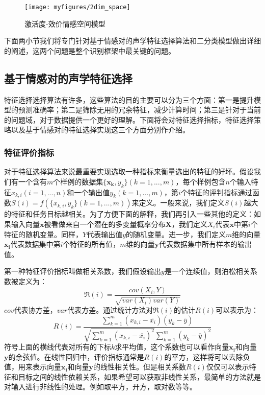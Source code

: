 \begin{figure}[H] %
    \centering
    \texttt{[image: myfigures/2dim\_space]}
    \caption{激活度-效价情感空间模型}
    \label{fig:xfig1}
\end{figure}

下面两小节我们将专门针对基于情感对的声学特征选择算法和二分类模型做出详细的阐述，这两个问题是整个识别框架中最关键的问题。

\subsection{基于情感对的声学特征选择}
\label{ssec:emo_pair_feature_select}
特征选择选择算法有许多，这些算法的目的主要可以分为三个方面：第一是提升模型的预测准确率；第二是筛除无用的冗余特征，减少计算时间；第三是针对于当前的问题域，对于数据提供一个更好的理解。下面将会对特征选择指标，特征选择策略以及基于情感对的特征选择实现这三个方面分别作介绍。

\subsubsection{特征评价指标}
\label{sssec:feature_select_metrics}
对于特征选择算法来说最重要实现选取一种指标来衡量选出的特征的好坏。假设我们有一个含有$m$个样例的数据集$\{\mathbf{x_k}, y_k\}(k=1,...,m)$，每个样例包含$n$个输入特征$x_{k,i}(i=1,...,n)$和一个输出值$y_k(k=1,...,m)$，第$i$个特征的评判指标通过函数$S(i)=f(\{x_{k,i}, y_k\}(k=1,...,m))$来定义。一般来说，我们定义$S(i)$越大的特征和任务目标越相关。为了方便下面的解释，我们再引入一些其他的定义：如果输入向量$\mathbf{x}$被看做来自一个潜在的多变量概率分布$\mathbf{X}$，我们定义$X_i$代表$\mathbf{x}$中第$i$个特征的随机变量。同样，$Y$代表输出值$y$的随机变量。进一步，我们定义$m$维的向量$\mathbf{x_i}$代表数据集中第$i$个特征的所有值，$m$维的向量$\mathbf{y}$代表数据集中所有样本的输出值。

第一种特征评价指标叫做相关系数，我们假设输出$y$是一个连续值，则泊松相关系数被定义为：
\begin{equation}
\label{equ:pearson_cc}
    \Re(i) = \frac{cov(X_i, Y)}{\sqrt{var(X_i)var(Y)}}
\end{equation}
$cov$代表协方差，$var$代表方差。通过统计方法对$\Re(i)$的估计$R(i)$可以表示为：
\begin{equation}
\label{equ:pearson_cc_real}
    R(i) = \frac{\sum_{k=1}^{m}(x_{k,i} - \overline{x_i})(y_k - \overline{y})}{\sqrt{\sum_{k=1}^{m}(x_{k,i} - \overline{x_i})^2}\sum_{k=1}^{m}(y_k - \overline{y})^2}
\end{equation}
符号上面的横线代表对所有的下标$k$求平均值，这个系数也可以看作向量$\mathbf{x_i}$和向量$\mathbf{y}$的余弦值。在线性回归中，评价指标通常是$R(i)$的平方，这样将可以去除负值，用来表示向量$\mathbf{x_i}$和向量$\mathbf{y}$的线性相关性。但是相关系数$R(i)$仅仅可以表示特征和目标之间的线性依赖关系，如果希望可以获取非线性关系，最简单的方法就是对输入进行非线性的处理。例如取平方，开方，取对数等等。

